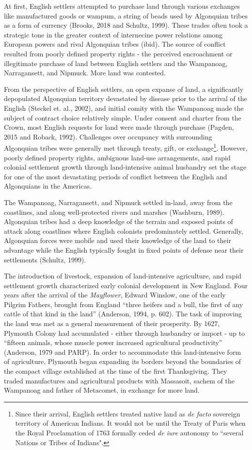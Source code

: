 \documentclass[sn-mathphys]{sn-jnl}%
\theoremstyle{thmstyleone}%
\theoremstyle{thmstyletwo}%
\theoremstyle{thmstylethree}%
\begin{document}
At first, English settlers attempted to purchase land through various exchanges like manufactured goods or wampum, a string of beads used by Algonquian tribes as a form of currency (Brooks, 2018 and Schultz, 1999). These trades often took a strategic tone in the greater context of internecine power relations among European powers and rival Algonquian tribes (ibid). The source of conflict resulted from poorly defined property rights - the perceived encroachment or illegitimate purchase of land between English settlers and the Wampanoag, Narragansett, and Nipmuck. More land was contested.

From the perspective of English settlers, an open expanse of land, a significantly depopulated Algonquian territory devastated by disease prior to the arrival of the English (Steckel et. al., 2002), and initial comity with the Wampanoag made the subject of contract choice relatively simple. Under consent and charter from the Crown, most English requests for land were made through purchase (Pagden, 2015 and Roback, 1992). Challenges over occupancy with surrounding Algonquian tribes were generally met through treaty, gift, or exchange\footnote{Since their arrival, English settlers treated native land as {\em de facto} sovereign territory of American Indians. It would not be until the Treaty of Paris when the Royal Proclamation of 1763 formally ceded {\em de iure} autonomy to ``several Nations or Tribes of Indians".}. However, poorly defined property rights, ambiguous land-use arrangements, and rapid colonial settlement growth through land-intensive animal husbandry set the stage for one of the most devastating periods of conflict between the English and Algonquians in the Americas.

The Wampanoag, Narragansett, and Nipmuck settled in-land, away from the coastlines, and along well-protected rivers and marshes (Washburn, 1989). Algonquian tribes had a deep knowledge of the terrain and exposed points of attack along coastlines where English colonists predominately settled. Generally, Algonquian forces were mobile and used their knowledge of the land to their advantage while the English typically fought in fixed points of defense near their settlements (Schultz, 1999). 

The introduction of livestock, expansion of land-intensive agriculture, and rapid settlement growth characterized early colonial development in New England. Four years after the arrival of the {\em Mayflower}, Edward Winslow, one of the early Pilgrim Fathers, brought from England ``three heifers and a bull, the first of any cattle of that kind in the land'' (Anderson, 1994, p. 602). The task of improving the land was met as a general measurement of their prosperity. By 1627, Plymouth Colony had accumulated - either through husbandry or import - up to ``fifteen animals, whose muscle power increased agricultural productivity'' (Anderson, 1979 and PARP). In order to accommodate this land-intensive form of agriculture, Plymouth began expanding its borders beyond the boundaries of the compact village established at the time of the first Thanksgiving. They traded manufactures and agricultural products with Massasoit, sachem of the Wampanoag and father of Metacomet, in exchange for more land.
\end{document}
